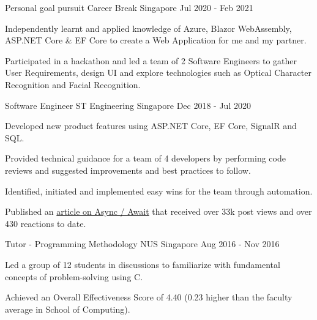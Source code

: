 \begin{cventries}
\cventry
{Personal goal pursuit} %
{Career Break} %
{Singapore} %
{Jul 2020 - Feb 2021} %
{
  \begin{cvitems} %
    \item {Independently learnt and applied knowledge of Azure, Blazor WebAssembly, ASP.NET Core \& EF Core to create a Web Application for me and my partner.}
    \item {Participated in a hackathon and led a team of 2 Software Engineers to gather User Requirements, design UI and explore technologies such as Optical Character Recognition and Facial Recognition.}
  \end{cvitems}
}

  \cventry
    {Software Engineer} %
    {ST Engineering} %
    {Singapore} %
    {Dec 2018 - Jul 2020} %
    {
      \begin{cvitems} %
        \item {Developed new product features using ASP.NET Core, EF Core, SignalR and SQL.}
        \item {Provided technical guidance for a team of 4 developers by performing code reviews and suggested improvements and best practices to follow.}
        \item {Identified, initiated and implemented easy wins for the team through automation.}
        \item {Published an \href{https://bit.ly/zy-async}{article on Async / Await} that received over 33k post views and over 430 reactions to date.}
      \end{cvitems}
    }


  \cventry
    {Tutor - Programming Methodology} %
    {NUS} %
    {Singapore} %
    {Aug 2016 - Nov 2016} %
    {
      \begin{cvitems} %
        \item {Led a group of 12 students in discussions to familiarize with fundamental concepts of problem-solving using C.}
        \item {Achieved an Overall Effectiveness Score of 4.40 (0.23 higher than the faculty average in School of Computing).}
      \end{cvitems}
    }

\end{cventries}
